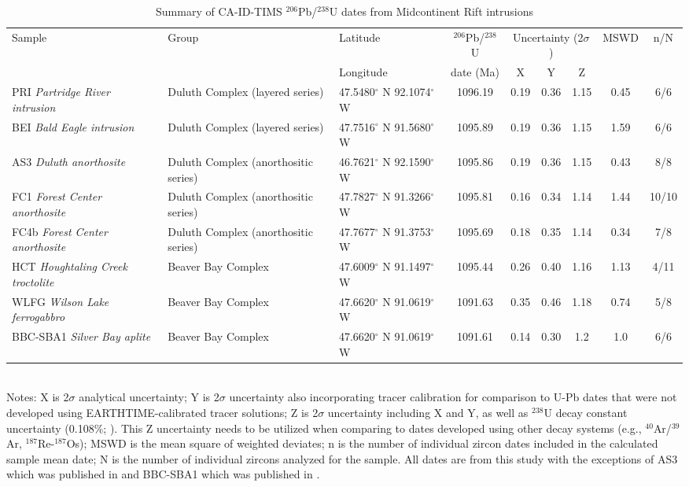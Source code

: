 \documentclass[11pt,letterpaper]{article}
\begin{document}
\begin{table}[h!]
\footnotesize
\caption{Summary of CA-ID-TIMS $^{206}$Pb/$^{238}$U dates from Midcontinent Rift intrusions}
\begin{tabular}{|p{3 cm}|p{3 cm}|p{1.8 cm}|c|ccc|c|c|}
\hline
Sample & Group & Latitude & $^{206}$Pb/$^{238}$U & \multicolumn{3}{|c|}{Uncertainty (2$\sigma$)} & MSWD & n/N \\
 &  & Longitude & date (Ma) & X & Y & Z & & \\
\hline
PRI \textit{Partridge River intrusion} & Duluth Complex (layered series) & 47.5480$^{\circ}$ N 92.1074$^{\circ}$ W & 1096.19 & 0.19 & 0.36 & 1.15 & 0.45 & 6/6 \\
\hline
BEI \textit{Bald Eagle intrusion} & Duluth Complex (layered series) & 47.7516$^{\circ}$ N 91.5680$^{\circ}$ W & 1095.89 & 0.19 & 0.36 & 1.15 & 1.59 & 6/6 \\
\hline
AS3 \textit{Duluth anorthosite} & Duluth Complex (anorthositic series) & 46.7621$^{\circ}$ N 92.1590$^{\circ}$ W & 1095.86 & 0.19 & 0.36 & 1.15 & 0.43 & 8/8 \\
\hline
FC1 \textit{Forest Center anorthosite} & Duluth Complex (anorthositic series) & 47.7827$^{\circ}$ N 91.3266$^{\circ}$ W & 1095.81 & 0.16 & 0.34 & 1.14 & 1.44 & 10/10 \\
\hline
FC4b \textit{Forest Center anorthosite} & Duluth Complex (anorthositic series) & 47.7677$^{\circ}$ N 91.3753$^{\circ}$ W & 1095.69 & 0.18 & 0.35 & 1.14 & 0.34 & 7/8 \\
\hline
HCT \textit{Houghtaling Creek troctolite} & Beaver Bay Complex & 47.6009$^{\circ}$ N 91.1497$^{\circ}$ W & 1095.44 & 0.26 & 0.40 & 1.16 & 1.13 & 4/11  \\
\hline
WLFG \textit{Wilson Lake ferrogabbro} & Beaver Bay Complex & 47.6620$^{\circ}$ N 91.0619$^{\circ}$ W & 1091.63 & 0.35 & 0.46 & 1.18 & 0.74 & 5/8 \\
\hline
BBC-SBA1 \textit{Silver Bay aplite} & Beaver Bay Complex & 47.6620$^{\circ}$ N 91.0619$^{\circ}$ W & 1091.61 & 0.14 & 0.30 & 1.2 & 1.0 & 6/6 \\
\hline
\end{tabular}\\
Notes: X is 2$\sigma$ analytical uncertainty; Y is 2$\sigma$ uncertainty also incorporating tracer calibration for comparison to U-Pb dates that were not developed using EARTHTIME-calibrated tracer solutions; Z is 2$\sigma$ uncertainty including X and Y, as well as $^{238}$U decay constant uncertainty (0.108$\%$; \citealp{Jaffey1971a}). This Z uncertainty needs to be utilized when comparing to dates developed using other decay systems (e.g., $^{40}$Ar/$^{39}$Ar, $^{187}$Re-$^{187}$Os); MSWD is the mean square of weighted deviates; n is the number of individual zircon dates included in the calculated sample mean date; N is the number of individual zircons analyzed for the sample. All dates are from this study with the exceptions of AS3 which was published in \cite{Schoene2006a} and BBC-SBA1 which was published in \cite{Fairchild2017a}.
\label{tab:geochron}
\end{table}
\end{document}
